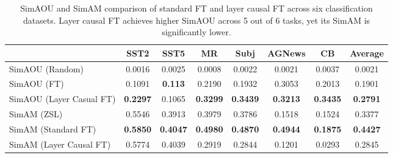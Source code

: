 \begin{table*}[h!]
	\centering
	\setlength{\tabcolsep}{7pt}
		\begin{tabular}{l| c c c c c c c }
			\toprule
			& \textbf{SST2} & \textbf{SST5} & \textbf{MR} & \textbf{Subj} & \textbf{AGNews} & \textbf{CB} & \textbf{Average}         \\
			\midrule
			 SimAOU (Random)        & 0.0016 & 0.0025 & 0.0008 & 0.0022 & 0.0021 & 0.0037 & 0.0021          \\
			 SimAOU (FT)            & 0.1091 & \textbf{0.113}  & 0.2190  & 0.1932  & 0.3053 & 0.2013 & 0.1901          \\
			 SimAOU (Layer Casual FT)  & \textbf{0.2297} & 0.1065 & \textbf{0.3299} & \textbf{0.3439} & \textbf{0.3213} & \textbf{0.3435} & \textbf{0.2791} \\
			 \midrule
			 SimAM (ZSL)                 & 0.5546 & 0.3913 & 0.3979 & 0.3786 & 0.1518 & 0.1524 & 0.3377          \\
			 SimAM (Standard FT)         & \textbf{0.5850}  & \textbf{0.4047} & \textbf{0.4980}  & \textbf{0.4870}  & \textbf{0.4944} & \textbf{0.1875} & \textbf{0.4427} \\
			 SimAM (Layer Causal FT)     & 0.5774 & 0.4039 & 0.2919 & 0.2844 & 0.1201 & 0.0293 & 0.2845          \\	
		\end{tabular}
		\caption{SimAOU and SimAM comparison of standard FT and layer causal FT across six classification datasets.
			Layer causal FT achieves higher SimAOU across 5 out of 6 tasks, yet its SimAM is significantly lower. 		
		}
		\label{tab:layer_causal}
\end{table*}
		